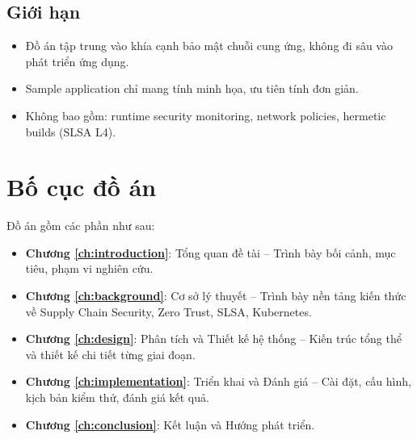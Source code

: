 \subsection{Giới hạn}
\begin{itemize}
    \item Đồ án tập trung vào khía cạnh bảo mật chuỗi cung ứng, không đi sâu vào phát triển ứng dụng.
    \item Sample application chỉ mang tính minh họa, ưu tiên tính đơn giản.
    \item Không bao gồm: runtime security monitoring, network policies, hermetic builds (SLSA L4).
\end{itemize}

\section{Bố cục đồ án}

Đồ án gồm các phần như sau:
\begin{itemize}
    \item \textbf{Chương \ref{ch:introduction}}: Tổng quan đề tài -- Trình bày bối cảnh, mục tiêu, phạm vi nghiên cứu.
    \item \textbf{Chương \ref{ch:background}}: Cơ sở lý thuyết -- Trình bày nền tảng kiến thức về Supply Chain Security, Zero Trust, SLSA, Kubernetes.
    \item \textbf{Chương \ref{ch:design}}: Phân tích và Thiết kế hệ thống -- Kiến trúc tổng thể và thiết kế chi tiết từng giai đoạn.
    \item \textbf{Chương \ref{ch:implementation}}: Triển khai và Đánh giá -- Cài đặt, cấu hình, kịch bản kiểm thử, đánh giá kết quả.
    \item \textbf{Chương \ref{ch:conclusion}}: Kết luận và Hướng phát triển.
\end{itemize}
